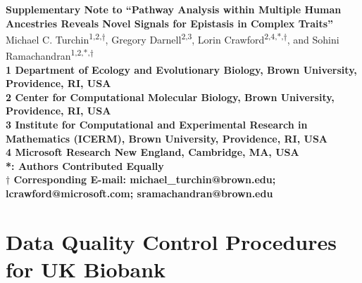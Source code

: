 \documentclass[10pt]{article}
\begin{document}

\begin{flushleft}
{\Large{\textbf{Supplementary Note to ``Pathway Analysis within Multiple Human Ancestries Reveals Novel Signals for Epistasis in Complex Traits''}}}
\newline
\\
Michael C. Turchin\textsuperscript{1,2,$\dagger$}, Gregory Darnell\textsuperscript{2,3}, Lorin Crawford\textsuperscript{2,4,*,$\dagger$}, and Sohini Ramachandran\textsuperscript{1,2,*,$\dagger$} 
\\
\bigskip
\bf{1} Department of Ecology and Evolutionary Biology, Brown University, Providence, RI, USA
\\
\bf{2} Center for Computational Molecular Biology, Brown University, Providence, RI, USA
\\
\bf{3} Institute for Computational and Experimental Research in Mathematics (ICERM), Brown University, Providence, RI, USA
\\
\bf{4} Microsoft Research New England, Cambridge, MA, USA
\\
\bigskip
*: Authors Contributed Equally\\
$\dagger$ Corresponding E-mail: michael\_turchin@brown.edu; lcrawford@microsoft.com; sramachandran@brown.edu 
\end{flushleft}

\setcounter{figure}{0}
\setcounter{table}{0}
\setcounter{equation}{0}
\makeatletter 

\tableofcontents

\clearpage
\newpage


\section{Data Quality Control Procedures for UK Biobank}
\end{document}
